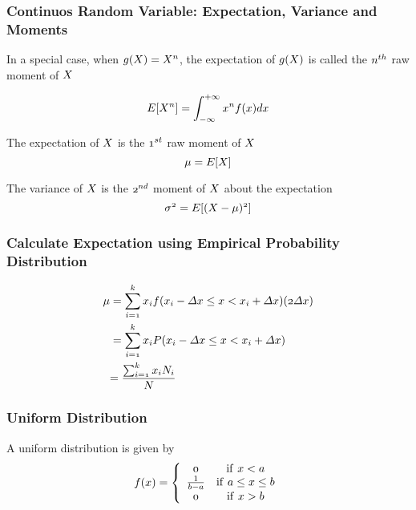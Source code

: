 \documentclass[notheorems, aspectratio=54]{beamer}
\begin{document}
\begin{frame}
\frametitle{Continuos Random Variable: Expectation, Variance and Moments}
In a special case, when $\mathnormal{g(X)=X^{n}}$, the expectation of $\mathnormal{g(X)}$ is called the $\mathnormal{n^{th}}$ raw moment of $\mathnormal{X}$

$$\mathnormal{E[X^{n}]=\int_{-\infty }^{+\infty }x^{n}f(x)dx}$$

The expectation of $\mathnormal{X}$ is the $\mathnormal{1^{st}}$ raw moment of $\mathnormal{X}$ 
$$\mathnormal{\mu=E[X]}$$
 
The variance of $\mathnormal{X}$ is the $\mathnormal{2^{nd}}$ moment of $\mathnormal{X}$ about the expectation  $$\mathnormal{\sigma^{2}=E[(X-\mu)^{2}]}$$

\end{frame}


\begin{frame}
\frametitle{Calculate Expectation using Empirical Probability Distribution}

\begin{align*}
 \mathnormal{\mu} &= \mathnormal{\sum_{i=1}^k x_i f(x_i-\Delta x \leq x < x_i+\Delta x )(2\Delta x)}\\
     &=\mathnormal{\sum_{i=1}^k x_i P(x_i-\Delta x \leq x < x_i+\Delta x )}\\
     &\mathnormal{=\frac{\sum_{i=1}^k x_i N_i}{N}}
\end{align*}

\end{frame}

\begin{frame}
\frametitle{Uniform Distribution}

A uniform distribution is given by
\begin{align*}
\mathnormal{f(x)} =
    \left\{
        \begin{array}{cc}
              \mathnormal{0} & \mathrm{if\ } \mathnormal{x<a} \\
              \frac{1}{\mathnormal{b-a}}  & \mathnormal{\mathrm{if\ } a\leq x \leq b} \\
              \mathnormal{0} & \mathrm{if\ } \mathnormal{x>b} \\
        \end{array} 
    \right.
\end{align*}

\begin{center}
\end{center}
\end{frame}
\end{document}
